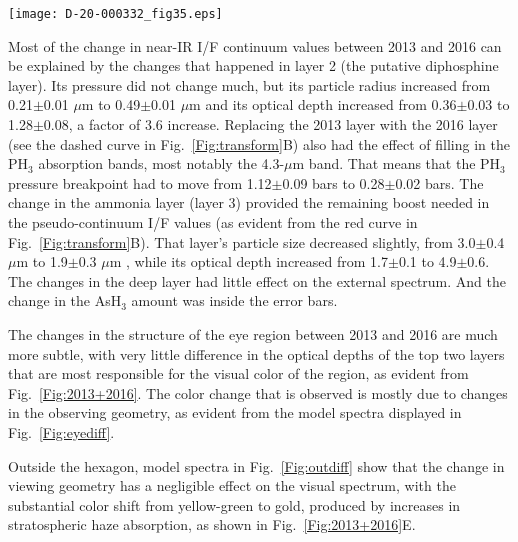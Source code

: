 \documentclass[article,11pt]{emulateapj}
\def\asht{AsH$_3$ }
\def\mum{$\mu$m }
\def\pht{PH$_3$ }
\begin{document}
\begin{figure*}[!ht]\centering
\texttt{[image: D-20-000332\_fig35.eps]}
\caption{{\bf A:} Spectra just outside the hexagon in 2013 (black, from
  location 8 in Fig.\ \ref{Fig:2013combined} and
  Table\ \ref{Tbl:bestfit2013} ), in 2016 (red, from location 10 in
  Fig.\ \ref{Fig:2016combined} and Table\ \ref{Tbl:bestfit2016}), and
  the 2013 model spectrum computed for the 2016 observing geometry
  (green) {\bf B:} a logarithmic plot of results in A. Note that the color
change here is not simply a result of a difference in observing geometry.}
\label{Fig:outdiff}
\end{figure*}


Most of the change in near-IR I/F continuum values between 2013 and 2016 can be explained by the changes that
happened in layer 2 (the putative diphosphine layer). Its pressure did not change much, but its particle
radius increased from 0.21$\pm$0.01 \mum to 0.49$\pm$0.01 \mum and its optical depth increased from 0.36$\pm$0.03 to
1.28$\pm$0.08, a factor of 3.6 increase. Replacing the 2013 layer with the 2016 layer (see the dashed
curve in Fig.\ \ref{Fig:transform}B) also had the
effect of filling in the \pht absorption bands, most notably the 4.3-\mum band.  That means
that the \pht pressure breakpoint had to move from 1.12$\pm$0.09 bars to 0.28$\pm$0.02 bars.
The change in the ammonia layer (layer 3) provided the remaining boost needed in the pseudo-continuum
I/F values (as evident from the red curve in Fig.\ \ref{Fig:transform}B). That layer's particle
size decreased slightly, from 3.0$\pm$0.4 \mum to 1.9$\pm$0.3 \mum, while its optical depth
increased from 1.7$\pm$0.1 to 4.9$\pm$0.6. The changes in the deep layer had little effect
on the external spectrum.  And the change in the \asht amount was inside the error bars.

The changes in the structure of the eye region between 2013 and 2016 are much more subtle, with
very little difference in the optical depths of the top two layers that are most responsible for the
visual color of the region, as evident from Fig.\ \ref{Fig:2013+2016}.  The color change that
is observed is mostly due to changes in the observing geometry, as evident from the model spectra
displayed in Fig.\ \ref{Fig:eyediff}. 

Outside the hexagon, model spectra in Fig.\ \ref{Fig:outdiff} show that the change in viewing
geometry has a negligible effect on the visual spectrum, with the substantial color shift
from yellow-green to gold, produced by increases in stratospheric haze absorption, as shown
in Fig.\ \ref{Fig:2013+2016}E.
\end{document}
